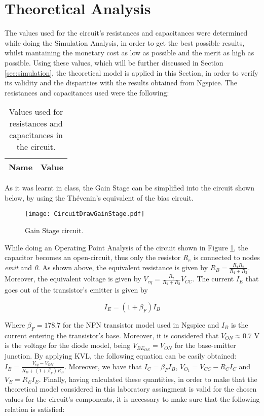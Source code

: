 \section{Theoretical Analysis} \label{sec:analysis}

The values used for the circuit's resistances and capacitances were determined while doing the Simulation Analysis, in order to get the best possible results, whilst mantaining the monetary cost as low as possible and the merit as high as possible. Using these values, which will be further discussed in Section \ref{sec:simulation}, the theoretical model is applied in this Section, in order to verify its validity and the disparities with the results obtained from Ngspice. The resistances and capacitances used were the following:


\begin{table}[H]
  \centering
  \begin{tabular}{|c|c|}
    \hline    
    {\bf Name} & {\bf Value} \\ \hline
    
  \end{tabular}
  \caption{Values used for resistances and capacitances in the circuit.}
  \label{tab:chosen_values}
\end{table}

As it was learnt in class, the Gain Stage can be simplified into the circuit shown below, by using the Thévenin's equivalent of the bias circuit.

\begin{figure}[H] \centering
  \texttt{[image: CircuitDrawGainStage.pdf]}
  \caption{Gain Stage circuit.}
  \label{fig:CircuitDrawGainStage}
\end{figure}

While doing an Operating Point Analysis of the circuit shown in Figure \ref{fig:CircuitDrawGainStage}, the capacitor becomes an open-circuit, thus only the resistor $R_e$ is connected to nodes \textit{emit} and \textit{0}. As shown above, the equivalent resistance is given by $R_B=\frac{R_1R_2}{R_1+R_2}$. Moreover, the equivalent voltage is given by $V_{eq}=\frac{R_2}{R_1+R_2}V_{CC}$. The current $I_E$ that goes out of the transistor's emitter is given by

\begin{equation}\label{eq:IE_GainStage}
  I_E=(1+\beta_F)I_B
\end{equation}

Where $\beta_F=178.7$ for the NPN transistor model used in Ngspice and $I_B$ is the current entering the transistor's base. Moreover, it is considered that $V_{ON}\approx0.7$ V is the voltage for the diode model, being $V_{BE_{ON}}=V_{ON}$ for the base-emitter junction. By applying KVL, the following equation can be easily obtained: $I_B=\frac{V_{eq}-V_{ON}}{R_B+(1+\beta_F)R_E}$. Moreover, we have that $I_C=\beta_FI_B$, $V_{O_1}=V_{CC}-R_CI_C$ and $V_E=R_EI_E$. Finally, having calculated these quantities, in order to make that the theoretical model considered in this laboratory assingment is valid for the chosen values for the circuit's components, it is necessary to make sure that the following relation is satisfied:

